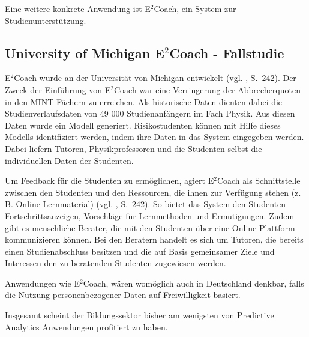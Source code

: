 Eine weitere konkrete Anwendung ist E$^2$Coach, ein System zur Studienunterstützung.

\subsection{University of Michigan E$^2$Coach - Fallstudie}

E$^2$Coach wurde an der Universität von Michigan entwickelt (vgl. \cite{Mattingly}, S.~242).
Der Zweck der Einführung von E$^2$Coach war eine Verringerung der Abbrecherquoten in den
MINT-Fächern zu erreichen. Als historische Daten dienten dabei die Studienverlaufsdaten von
49 000 Studienanfängern im Fach Physik. Aus diesen Daten wurde ein Modell generiert.
Risikostudenten können mit Hilfe dieses Modells identifiziert werden, indem ihre Daten in das
System eingegeben werden. Dabei liefern Tutoren, Physikprofessoren und die Studenten selbst
die individuellen Daten der Studenten.

Um Feedback für die Studenten zu ermöglichen, agiert E$^2$Coach als Schnittstelle zwischen
den Studenten und den Ressourcen, die ihnen zur Verfügung stehen (z. B. Online Lernmaterial) (vgl. \cite{Mattingly}, S.~242).
So bietet das System den Studenten Fortschrittsanzeigen, Vorschläge für Lernmethoden und Ermutigungen.
Zudem gibt es menschliche Berater, die mit den Studenten über eine Online-Plattform kommunizieren können.
Bei den Beratern handelt es sich um Tutoren, die bereits einen Studienabschluss besitzen und die auf Basis
gemeinsamer Ziele und Interessen den zu beratenden Studenten zugewiesen werden.

Anwendungen wie E$^2$Coach, wären womöglich auch in Deutschland denkbar, falls die Nutzung personenbezogener
Daten auf Freiwilligkeit basiert.

Insgesamt scheint der Bildungssektor bisher am wenigsten von
Predictive Analytics Anwendungen profitiert zu haben.

